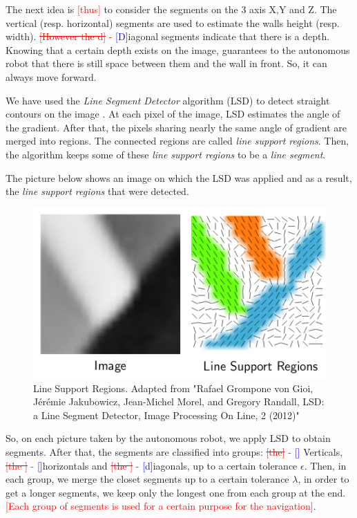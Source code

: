 \documentclass[12pt]{report}
\newcommand{\hcr}[2]{\textcolor{red}{\sout{[#1]} - \textcolor{blue}{ [#2]}}}
\newcommand{\hc}[1]{\textcolor{red}{[#1]}}
\begin{document}
	 The next idea is \hc{thus} to consider the segments on the 3 axis X,Y and Z. The vertical (resp. horizontal) 
segments are used to estimate the walls height (resp. width). \hcr{However the d}{D}iagonal segments indicate that 
there is a depth. Knowing that a certain depth exists on the image, guarantees to the autonomous robot that there is 
still space between them and the wall in front. So, it can always move forward.
	  
	  We have used the \textit{Line Segment Detector} algorithm (LSD) to detect straight contours on the 
image \cite{grompone_von_gioi_lsd:_2012}. At each pixel of the image, LSD estimates the angle of the gradient. After 
that, the pixels sharing nearly the same angle of gradient are merged into regions. The connected regions are called 
\textit{line support regions}. Then, the algorithm keeps some of these \textit{line support regions} to be a 
\textit{line segment}.
	  
	 
	  The picture below shows an image on which the LSD was applied and as a result, the \textit{line support regions} that were detected.
	  	\begin{figure}[H]
	  	\begin{center}
	  		\includegraphics[scale=0.6]{res/lsr.png}
	  		\caption{Line Support Regions. Adapted from "Rafael Grompone von Gioi, Jérémie Jakubowicz, Jean-Michel Morel, and Gregory Randall, LSD: a Line Segment Detector, Image Processing On Line, 2 (2012)" }
	  	\end{center}
	  \end{figure}
  
  So, on each picture taken by the autonomous robot, we apply LSD to obtain segments. After that, the segments are 
classified into groups: \hcr{the}{} Verticals, \hcr{the }{}horizontals and \hcr{the }diagonals, up to a certain 
tolerance $\epsilon$. Then, in each group, we merge the closet segments up to a certain tolerance $\lambda$, in order to 
get a longer segments, we keep only the longest one from each group at the end. \hc{Each group of segments is used for a 
certain purpose for the navigation}.
  
\end{document}
